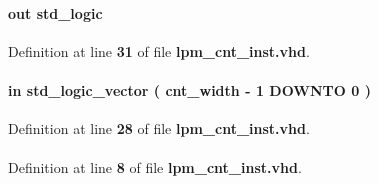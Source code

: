 \paragraph[{cout}]{ {\bfseries \textcolor{keywordflow}{out}\textcolor{vhdlchar}{ }} {\bfseries \textcolor{comment}{std\+\_\+logic}\textcolor{vhdlchar}{ }} \hspace{0.3cm}{\ttfamily [Port]}}\label{classlpm__cnt__inst_a4b6626066f152e80c3fa064577009f1d}


Definition at line {\bf 31} of file {\bf lpm\+\_\+cnt\+\_\+inst.\+vhd}.

\paragraph[{data}]{ {\bfseries \textcolor{keywordflow}{in}\textcolor{vhdlchar}{ }} {\bfseries \textcolor{comment}{std\+\_\+logic\+\_\+vector}\textcolor{vhdlchar}{ }\textcolor{vhdlchar}{(}\textcolor{vhdlchar}{ }\textcolor{vhdlchar}{ }\textcolor{vhdlchar}{ }\textcolor{vhdlchar}{ }{\bfseries {\bf cnt\+\_\+width}} \textcolor{vhdlchar}{-\/}\textcolor{vhdlchar}{ } \textcolor{vhdldigit}{1} \textcolor{vhdlchar}{ }\textcolor{keywordflow}{D\+O\+W\+N\+TO}\textcolor{vhdlchar}{ }\textcolor{vhdlchar}{ } \textcolor{vhdldigit}{0} \textcolor{vhdlchar}{ }\textcolor{vhdlchar}{)}\textcolor{vhdlchar}{ }} \hspace{0.3cm}{\ttfamily [Port]}}\label{classlpm__cnt__inst_a1700b2c1f7dcefdf977d56d3461fc95f}


Definition at line {\bf 28} of file {\bf lpm\+\_\+cnt\+\_\+inst.\+vhd}.

\paragraph[{ieee}]{\hspace{0.3cm}{\ttfamily [Library]}}\label{classlpm__cnt__inst_a0a6af6eef40212dbaf130d57ce711256}


Definition at line {\bf 8} of file {\bf lpm\+\_\+cnt\+\_\+inst.\+vhd}.

